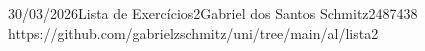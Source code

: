 \documentclass{article}
\begin{document}
{30/03/2026}{Lista de Exercícios}{2}{Gabriel dos Santos Schmitz}{2487438}
{https://github.com/gabrielzschmitz/uni/tree/main/al/lista2}




\newpage
\printbibliography\
\end{document}
